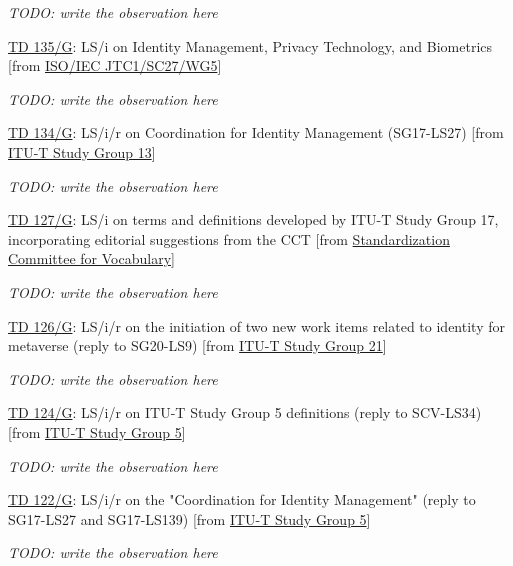 \textit{TODO: write the observation here}

\href{https://www.itu.int/md/meetingdoc.asp?lang=en\&parent=T25-SG17-251203-TD-GEN-0135}{TD 135/G}: LS/i on Identity Management, Privacy Technology, and Biometrics  [from \href{https://www.itu.int/md/meetingdoc.asp?lang=en\&parent=T25-SG17-251203-TD-GEN\&question=Q10/17\&source=ISO/IEC\%20JTC1/SC27/WG5}{ISO/IEC JTC1/SC27/WG5}]

\textit{TODO: write the observation here}

\href{https://www.itu.int/md/meetingdoc.asp?lang=en\&parent=T25-SG17-251203-TD-GEN-0134}{TD 134/G}: LS/i/r on Coordination for Identity Management (SG17-LS27)  [from \href{https://www.itu.int/md/meetingdoc.asp?lang=en\&parent=T25-SG17-251203-TD-GEN\&question=Q10/17\&source=ITU-T\%20Study\%20Group\%2013}{ITU-T Study Group 13}]

\textit{TODO: write the observation here}

\href{https://www.itu.int/md/meetingdoc.asp?lang=en\&parent=T25-SG17-251203-TD-GEN-0127}{TD 127/G}: LS/i on terms and definitions developed by ITU-T Study Group 17, incorporating editorial suggestions from the CCT  [from \href{https://www.itu.int/md/meetingdoc.asp?lang=en\&parent=T25-SG17-251203-TD-GEN\&question=Q10/17\&source=Standardization\%20Committee\%20for\%20Vocabulary}{Standardization Committee for Vocabulary}]

\textit{TODO: write the observation here}

\href{https://www.itu.int/md/meetingdoc.asp?lang=en\&parent=T25-SG17-251203-TD-GEN-0126}{TD 126/G}: LS/i/r on the initiation of two new work items related to identity for metaverse (reply to SG20-LS9)  [from \href{https://www.itu.int/md/meetingdoc.asp?lang=en\&parent=T25-SG17-251203-TD-GEN\&question=Q10/17\&source=ITU-T\%20Study\%20Group\%2021}{ITU-T Study Group 21}]

\textit{TODO: write the observation here}

\href{https://www.itu.int/md/meetingdoc.asp?lang=en\&parent=T25-SG17-251203-TD-GEN-0124}{TD 124/G}: LS/i/r on ITU-T Study Group 5 definitions (reply to SCV-LS34)  [from \href{https://www.itu.int/md/meetingdoc.asp?lang=en\&parent=T25-SG17-251203-TD-GEN\&question=Q10/17\&source=ITU-T\%20Study\%20Group\%205}{ITU-T Study Group 5}]

\textit{TODO: write the observation here}

\href{https://www.itu.int/md/meetingdoc.asp?lang=en\&parent=T25-SG17-251203-TD-GEN-0122}{TD 122/G}: LS/i/r on the "Coordination for Identity Management" (reply to SG17-LS27 and SG17-LS139)  [from \href{https://www.itu.int/md/meetingdoc.asp?lang=en\&parent=T25-SG17-251203-TD-GEN\&question=Q10/17\&source=ITU-T\%20Study\%20Group\%205}{ITU-T Study Group 5}]

\textit{TODO: write the observation here}
